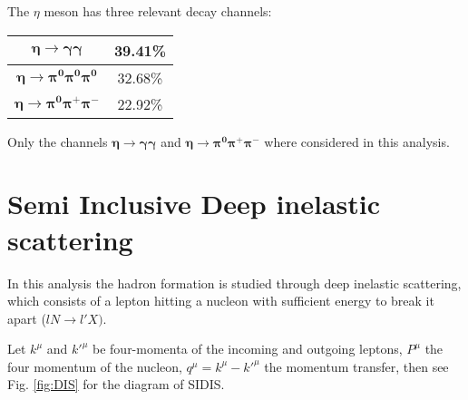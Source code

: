 The $\eta$ meson has three relevant decay channels:

\begin{table}[ht!]
\centering
\begin{tabular}{|c|c|}
\hline
$\bm{\eta \rightarrow \gamma \gamma}$ &  39.41\%\\\hline
$\bm{\eta \rightarrow \pi^0 \pi^0 \pi^0}$ &  32.68\%\\\hline
$\bm{\eta \rightarrow \pi^0 \pi^+ \pi^-}$ &  22.92\%\\\hline
\end{tabular}
\label{tab:eta_decay}
\end{table}

Only the channels $\bm{\eta \rightarrow \gamma \gamma}$ and $\bm{\eta \rightarrow \pi^0 \pi^+ \pi^-}$ where considered in this analysis.

\nocite{LQCD_1,LQCD_2,LQCD_3}
%  
\section{Semi Inclusive Deep inelastic scattering}
In this analysis the hadron formation is studied through deep inelastic scattering, which consists of a lepton hitting a nucleon with sufficient energy to break it apart ($lN \rightarrow l'X)$. 

Let $k^\mu$ and $k'^\mu$ be four-momenta of the incoming and outgoing leptons, $P^\mu$ the four momentum of the nucleon, $q^\mu=k^\mu - k'^\mu$ the momentum transfer, then see Fig. \ref{fig:DIS} for the diagram of SIDIS. 

